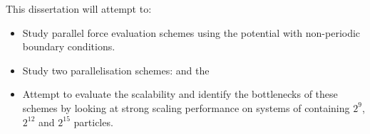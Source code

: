%
This dissertation will attempt to:
\begin{itemize}
\item
    Study parallel force evaluation schemes using
    the \twobody{} \LennardJones{} potential with
    non-periodic boundary conditions.

\item
    Study two parallelisation schemes:
    \replicateddata{} and the \systolicloop{}

\item
    Attempt to evaluate the scalability and
    identify the bottlenecks of these schemes
    by looking at strong scaling performance
    on systems of containing
    $2^{9}$, $2^{12}$ and $2^{15}$ particles.
\end  {itemize}
